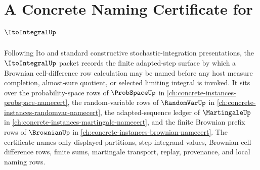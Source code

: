 \chapter{A Concrete Naming Certificate for $\ItoIntegralUp$}
\label{ch:concrete-instances-ito-integral-namecert}

Following Ito and standard constructive stochastic-integration presentations, the $\ItoIntegralUp$ packet records the finite adapted-step surface by which a Brownian cell-difference row calculation may be named before any host measure completion, almost-sure quotient, or selected limiting integral is invoked. It sits over the probability-space rows of $\ProbSpaceUp$ in \autoref{ch:concrete-instances-probspace-namecert}, the random-variable rows of $\RandomVarUp$ in \autoref{ch:concrete-instances-randomvar-namecert}, the adapted-sequence ledger of $\MartingaleUp$ in \autoref{ch:concrete-instances-martingale-namecert}, and the finite Brownian prefix rows of $\BrownianUp$ in \autoref{ch:concrete-instances-brownian-namecert}. The certificate names only displayed partitions, step integrand values, Brownian cell-difference rows, finite sums, martingale transport, replay, provenance, and local naming rows.

